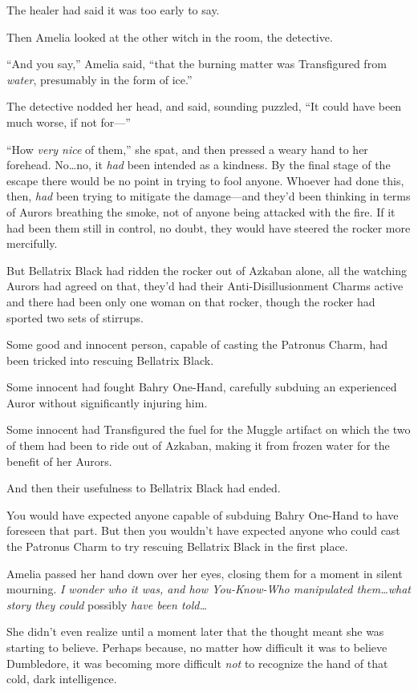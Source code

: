 The healer had said it was too early to say.

Then Amelia looked at the other witch in the room, the detective.

“And you say,” Amelia said, “that the burning matter was Transfigured from \emph{water}, presumably in the form of ice.”

The detective nodded her head, and said, sounding puzzled, “It could have been much worse, if not for—”

“How \emph{very nice} of them,” she spat, and then pressed a weary hand to her forehead. No…no, it \emph{had} been intended as a kindness. By the final stage of the escape there would be no point in trying to fool anyone. Whoever had done this, then, \emph{had} been trying to mitigate the damage—and they’d been thinking in terms of Aurors breathing the smoke, not of anyone being attacked with the fire. If it had been them still in control, no doubt, they would have steered the rocker more mercifully.

But Bellatrix Black had ridden the rocker out of Azkaban alone, all the watching Aurors had agreed on that, they’d had their Anti-Disillusionment Charms active and there had been only one woman on that rocker, though the rocker had sported two sets of stirrups.

Some good and innocent person, capable of casting the Patronus Charm, had been tricked into rescuing Bellatrix Black.

Some innocent had fought Bahry One-Hand, carefully subduing an experienced Auror without significantly injuring him.

Some innocent had Transfigured the fuel for the Muggle artifact on which the two of them had been to ride out of Azkaban, making it from frozen water for the benefit of her Aurors.

And then their usefulness to Bellatrix Black had ended.

You would have expected anyone capable of subduing Bahry One-Hand to have foreseen that part. But then you wouldn’t have expected anyone who could cast the Patronus Charm to try rescuing Bellatrix Black in the first place.

Amelia passed her hand down over her eyes, closing them for a moment in silent mourning. \emph{I wonder who it was, and how You-Know-Who manipulated them…what story they could} possibly \emph{have been told…}

She didn’t even realize until a moment later that the thought meant she was starting to believe. Perhaps because, no matter how difficult it was to believe Dumbledore, it was becoming more difficult \emph{not} to recognize the hand of that cold, dark intelligence.

